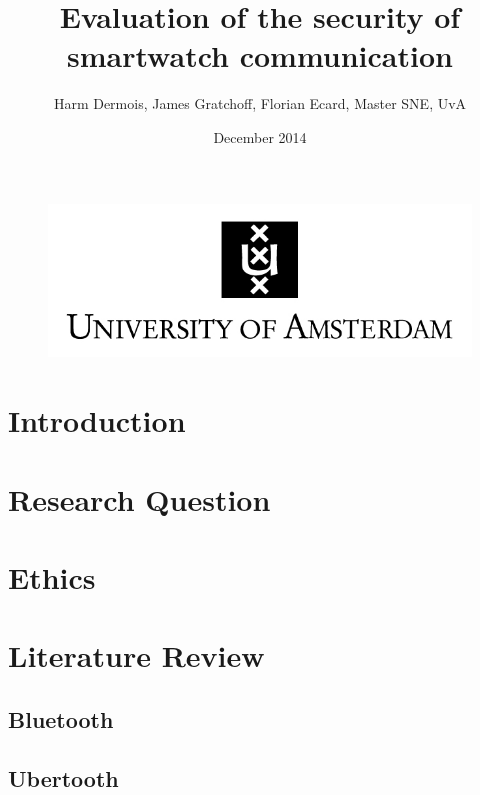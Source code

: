 \documentclass{article}
\begin{document}
 

\begin{figure}[!h]
 	\begin{center}
		\huge \title{Evaluation of the security of smartwatch communication}
		\author{Harm Dermois, James Gratchoff, Florian Ecard,  Master SNE, UvA} 
		\date{December 2014\\}
	\maketitle 
		\includegraphics{uva.jpeg}
		\label{sec:uva}
	\end{center}
\end{figure}

\newpage

\tableofcontents

\newpage

\section{Introduction}
\newpage
\section{Research Question}
\newpage
\section{Ethics} %

\newpage
\section{Literature Review}

	\subsection{Bluetooth}
	\subsection{Ubertooth}
\end{document}
